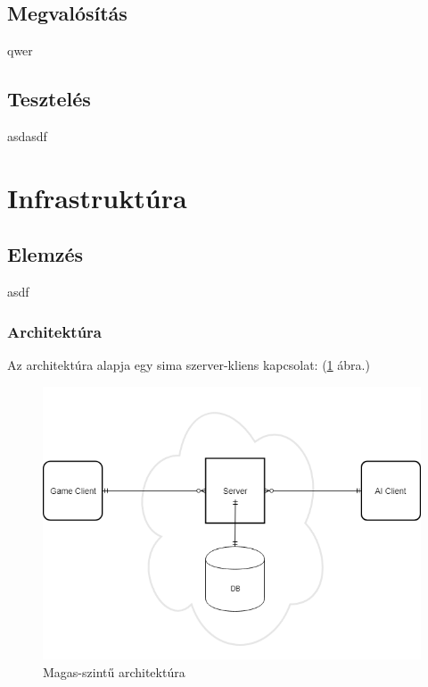 \documentclass[twoside, a4paper, 12pt]{article}
\begin{document}
\subsection{Megvalósítás}
qwer

\subsection{Tesztelés}

asdasdf



\section{Infrastruktúra}
\subsection{Elemzés}
asdf


















\subsubsection{Architektúra}
Az architektúra alapja egy sima szerver-kliens kapcsolat: (\ref{fig:highLevelArchitecture} ábra.)

\begin{figure}[htbp]
	\centering
	\includegraphics[width=1.0\textwidth]{img/highLevelArchitecture.png}
	\caption{Magas-szintű architektúra}
	\label{fig:highLevelArchitecture}
\end{figure}
\end{document}
